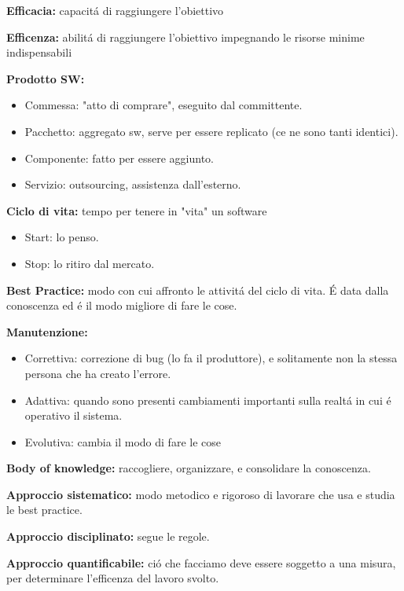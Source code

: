 \documentclass{article}
\begin{document}
\bigbreak
\textbf{Efficacia: }capacit\'a di raggiungere l'obiettivo

\bigbreak
\textbf{Efficenza: }abilit\'a di raggiungere l'obiettivo impegnando le risorse minime indispensabili

\bigbreak
\textbf{Prodotto SW: }
    \begin{itemize}
        \item Commessa: "atto di comprare", eseguito dal committente.
        \item Pacchetto: aggregato sw, serve per essere replicato (ce ne sono tanti identici).
        \item Componente: fatto per essere aggiunto.
        \item Servizio: outsourcing, assistenza dall'esterno.
    \end{itemize}

\bigbreak
\textbf{Ciclo di vita: }tempo per tenere in "vita" un software 
    \begin{itemize}
        \item Start: lo penso.
        \item Stop: lo ritiro dal mercato.
    \end{itemize}
    
\bigbreak
\textbf{Best Practice: } modo con cui affronto le attivit\'a del ciclo di vita. \'E data dalla conoscenza ed \'e il modo migliore di fare le cose.

\bigbreak
\textbf{Manutenzione: }
    \begin{itemize}
        \item Correttiva: correzione di bug (lo fa il produttore), e solitamente non la stessa persona che ha creato l'errore.
        \item Adattiva: quando sono presenti cambiamenti importanti sulla realt\'a in cui \'e operativo il sistema.
        \item Evolutiva: cambia il modo di fare le cose
    \end{itemize}

\bigbreak
\textbf{Body of knowledge: }raccogliere, organizzare, e consolidare la conoscenza.

\bigbreak
\textbf{Approccio sistematico: }modo metodico e rigoroso di lavorare che usa e studia le best practice.

\bigbreak
\textbf{Approccio disciplinato: }segue le regole.

\bigbreak
\textbf{Approccio quantificabile: }ci\'o che facciamo deve essere soggetto a una misura, per determinare l'efficenza del lavoro svolto.
\end{document}

